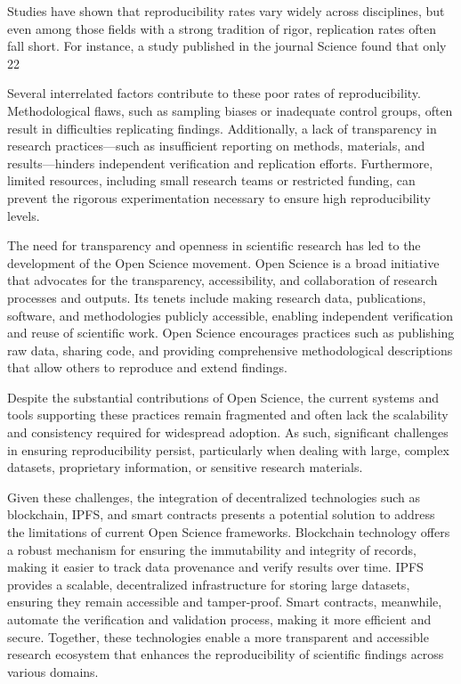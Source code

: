 \documentclass{article}
\begin{document}
Studies have shown that reproducibility rates vary widely across disciplines, but even among those fields with a strong tradition of rigor, replication rates often fall short. For instance, a study published in the journal Science found that only 22%

Several interrelated factors contribute to these poor rates of reproducibility. Methodological flaws, such as sampling biases or inadequate control groups, often result in difficulties replicating findings. Additionally, a lack of transparency in research practices—such as insufficient reporting on methods, materials, and results—hinders independent verification and replication efforts. Furthermore, limited resources, including small research teams or restricted funding, can prevent the rigorous experimentation necessary to ensure high reproducibility levels.

The need for transparency and openness in scientific research has led to the development of the Open Science movement. Open Science is a broad initiative that advocates for the transparency, accessibility, and collaboration of research processes and outputs. Its tenets include making research data, publications, software, and methodologies publicly accessible, enabling independent verification and reuse of scientific work. Open Science encourages practices such as publishing raw data, sharing code, and providing comprehensive methodological descriptions that allow others to reproduce and extend findings.

Despite the substantial contributions of Open Science, the current systems and tools supporting these practices remain fragmented and often lack the scalability and consistency required for widespread adoption. As such, significant challenges in ensuring reproducibility persist, particularly when dealing with large, complex datasets, proprietary information, or sensitive research materials.

Given these challenges, the integration of decentralized technologies such as blockchain, IPFS, and smart contracts presents a potential solution to address the limitations of current Open Science frameworks. Blockchain technology offers a robust mechanism for ensuring the immutability and integrity of records, making it easier to track data provenance and verify results over time. IPFS provides a scalable, decentralized infrastructure for storing large datasets, ensuring they remain accessible and tamper-proof. Smart contracts, meanwhile, automate the verification and validation process, making it more efficient and secure. Together, these technologies enable a more transparent and accessible research ecosystem that enhances the reproducibility of scientific findings across various domains.
\end{document}
